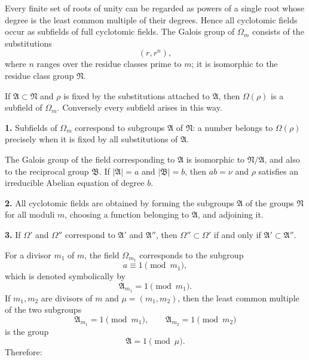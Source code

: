 \documentclass[11pt]{article}
\providecommand{\grpA}{\mathfrak A}
\providecommand{\grpB}{\mathfrak B}
\providecommand{\grpN}{\mathfrak N}
\begin{document}
Every finite set of roots of unity can be regarded as powers of a single root whose degree is the least common multiple of their degrees. Hence all cyclotomic fields occur as subfields of full cyclotomic fields. The Galois group of $\Omega_m$ consists of the substitutions
\begin{equation}
 (r,r^n),
\tag{3}
\end{equation}
where $n$ ranges over the residue classes prime to $m$; it is isomorphic to the residue class group $\grpN$.

If $\grpA\subset\grpN$ and $\rho$ is fixed by the substitutions attached to $\grpA$, then $\Omega(\rho)$ is a subfield of $\Omega_m$. Conversely every subfield arises in this way.

\medskip
\noindent\textbf{1.} Subfields of $\Omega_m$ correspond to subgroups $\grpA$ of $\grpN$: a number belongs to $\Omega(\rho)$ precisely when it is fixed by all substitutions of $\grpA$.

The Galois group of the field corresponding to $\grpA$ is isomorphic to $\grpN/\grpA$, and also to the reciprocal group $\grpB$. If $|\grpA|=a$ and $|\grpB|=b$, then $ab=\nu$ and $\rho$ satisfies an irreducible Abelian equation of degree $b$.

\medskip
\noindent\textbf{2.} All cyclotomic fields are obtained by forming the subgroups $\grpA$ of the groups $\grpN$ for all moduli $m$, choosing a function belonging to $\grpA$, and adjoining it.

\medskip
\noindent\textbf{3.} If $\Omega'$ and $\Omega''$ correspond to $\grpA'$ and $\grpA''$, then $\Omega''\subset\Omega'$ if and only if $\grpA'\subset\grpA''$.

For a divisor $m_1$ of $m$, the field $\Omega_{m_1}$ corresponds to the subgroup
\begin{equation}
 a\equiv1\pmod {m_1},
\tag{4}
\end{equation}
which is denoted symbolically by
\begin{equation}
 \grpA_{m_1}=1\pmod {m_1}.
\tag{5}
\end{equation}
If $m_1,m_2$ are divisors of $m$ and $\mu=(m_1,m_2)$, then the least common multiple of the two subgroups
\begin{equation}
 \grpA_{m_1}=1\pmod {m_1},\qquad
 \grpA_{m_2}=1\pmod {m_2}
\tag{6}
\end{equation}
is the group
\begin{equation}
 \grpA=1\pmod \mu.
\tag{7}
\end{equation}
Therefore:
\end{document}
